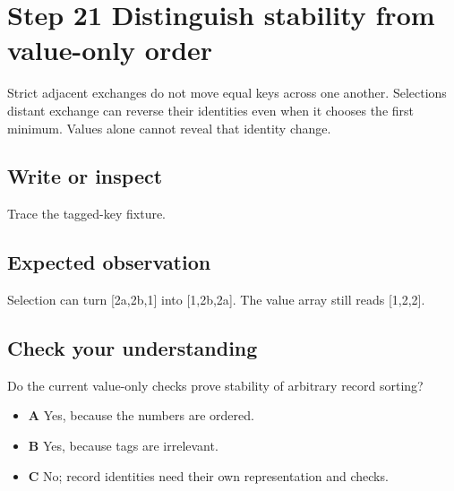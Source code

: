 \section{Step 21 Distinguish stability from value-only
  order}\label{009-sorting-visualizer-s21-step-21-distinguish-stability-from-value-only-order}

Strict adjacent exchanges do not move equal keys across one another.
Selection\textquotesingle s distant exchange can reverse their
identities even when it chooses the first minimum. Values alone cannot
reveal that identity change.

\subsection{Write or
  inspect}\label{009-sorting-visualizer-s21-write-or-inspect}

Trace the tagged-key fixture.

\subsection{Expected
  observation}\label{009-sorting-visualizer-s21-expected-observation}

Selection can turn {[}2a,2b,1{]} into {[}1,2b,2a{]}. The value array
still reads {[}1,2,2{]}.

\subsection{Check your
  understanding}\label{009-sorting-visualizer-s21-check-your-understanding}

Do the current value-only checks prove stability of arbitrary record
sorting?

\begin{itemize}
  \tightlist
  \item
        \textbf{A} Yes, because the numbers are ordered.
  \item
        \textbf{B} Yes, because tags are irrelevant.
  \item
        \textbf{C} No; record identities need their own representation and
        checks.
\end{itemize}

